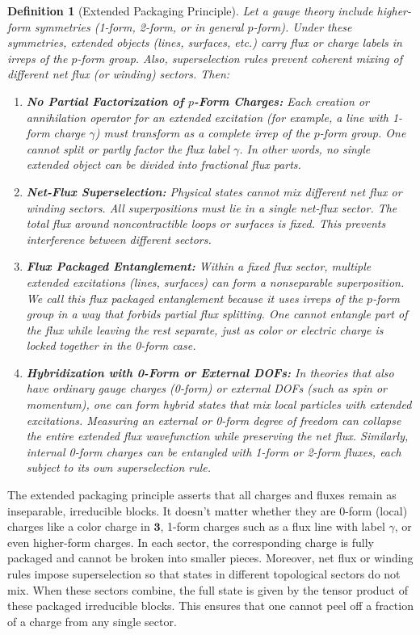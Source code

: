 \documentclass[12pt,a4paper]{article}
\newtheorem{definition}{Definition}
\begin{document}
\begin{definition}[Extended Packaging Principle]
	Let a gauge theory include higher-form symmetries (1-form, 2-form, or in general $p$-form).
	Under these symmetries, extended objects (lines, surfaces, etc.) carry flux or charge labels in irreps of the $p$-form group.
	Also, superselection rules prevent coherent mixing of different net flux (or winding) sectors. Then:
	\begin{enumerate}
		\item \textbf{No Partial Factorization of $p$-Form Charges:}  
		Each creation or annihilation operator for an extended excitation (for example, a line with 1-form charge $\gamma$) must transform as a complete irrep of the $p$-form group.
		One cannot split or partly factor the flux label $\gamma$.
		In other words, no single extended object can be divided into fractional flux parts.
		
		\item \textbf{Net-Flux Superselection:}  
		Physical states cannot mix different net flux or winding sectors.
		All superpositions must lie in a single net-flux sector.
		The total flux around noncontractible loops or surfaces is fixed.
		This prevents interference between different sectors.
		
		\item \textbf{Flux Packaged Entanglement:}  
		Within a fixed flux sector, multiple extended excitations (lines, surfaces) can form a nonseparable superposition.
		We call this flux packaged entanglement because it uses irreps of the $p$-form group in a way that forbids partial flux splitting.
		One cannot entangle part of the flux while leaving the rest separate, just as color or electric charge is locked together in the 0-form case.
		
		\item \textbf{Hybridization with 0-Form or External DOFs:}  
		In theories that also have ordinary gauge charges (0-form) or external DOFs (such as spin or momentum), one can form hybrid states that mix local particles with extended excitations.
		Measuring an external or 0-form degree of freedom can collapse the entire extended flux wavefunction while preserving the net flux.
		Similarly, internal 0-form charges can be entangled with 1-form or 2-form fluxes, each subject to its own superselection rule.
	\end{enumerate}
\end{definition}


The extended packaging principle asserts that all charges and fluxes remain as inseparable, irreducible blocks.
It doesn't matter whether they are 0-form (local) charges like a color charge in $\mathbf{3}$, 1-form charges such as a flux line with label $\gamma$, or even higher-form charges.
In each sector, the corresponding charge is fully packaged and cannot be broken into smaller pieces.
Moreover, net flux or winding rules impose superselection so that states in different topological sectors do not mix.
When these sectors combine, the full state is given by the tensor product of these packaged irreducible blocks.
This ensures that one cannot peel off a fraction of a charge from any single sector.
	
\end{document}
